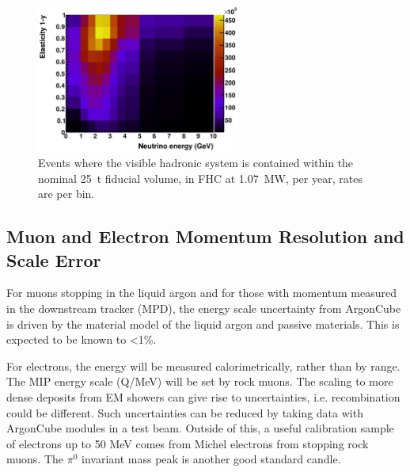 \begin{figure}[tbp]
	\centering
	\includegraphics[width=0.6\textwidth]{graphics/hadContNorm_ey.png}
	\caption{Events where the visible hadronic system is contained within the nominal \SI{25}{\tonne} fiducial volume, in FHC at \SI{1.07}{\mega\watt}, per year, rates are per bin.}
	\label{fig:hadContNorm_ey}
\end{figure}


\subsection{Muon and Electron Momentum Resolution and Scale Error}


For muons stopping in the liquid argon and for those with momentum measured in the downstream tracker (MPD), the energy scale uncertainty from ArgonCube is driven by the material model of the liquid argon and passive materials.  This is expected to be known to \textless 1\%.

For electrons, the energy will be measured calorimetrically, rather than by range.  The MIP energy scale (Q/MeV) will be set by rock muons.  The scaling to more dense deposits from EM showers can give rise to uncertainties, i.e. recombination could be different.  Such uncertainties can be reduced by taking data with ArgonCube modules in a test beam.  Outside of this, a useful calibration sample
of electrons up to 50 MeV comes from Michel electrons from stopping rock muons. The $\pi^0$ invariant mass peak is another good standard candle.


